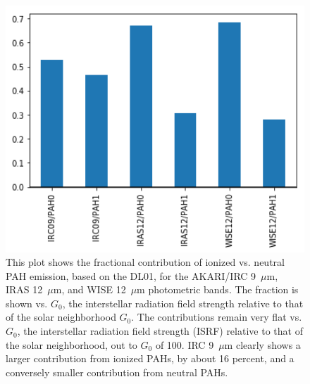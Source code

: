 \documentclass[preprint2,longabstract]{aastex}
\begin{document}
\begin{figure}
\label{fig:inband_ionfrac_bar}
\centering
\includegraphics[width=150mm]{../Plots/InBandContribution_PAH_bar.png}
\caption{This plot shows the fractional contribution of ionized vs. neutral PAH emission, based on the DL01, for the AKARI/IRC 9~$\mu$m, IRAS 12~$\mu$m, and WISE 12~$\mu$m photometric bands. The fraction is shown vs. $G_{0}$, the interstellar radiation field strength relative to that of the solar neighborhood $G_{0}$. The contributions remain very flat vs. $G_{0}$, the interstellar radiation field strength (ISRF) relative to that of the solar neighborhood, out to $G_{0}$ of 100. IRC 9~$\mu$m clearly shows a larger contribution from ionized PAHs, by about 16 percent, and a conversely smaller contribution from neutral PAHs. }
\end{figure}

\end{document}
